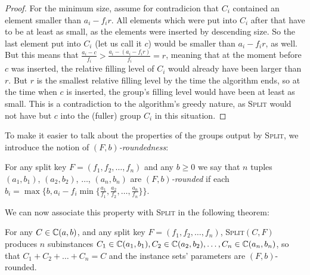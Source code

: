 \documentclass[%
    a4paper,              %
    style=screen,          %
    bibliography=totoc,   %
    nexus,                %
    lnum,                 %
    extramargin,          %
]{tubsbook}
\begin{document}
\begin{proof}
    For the minimum size, assume for contradicion that $C_i$ contained an element smaller than $a_i - f_i r$. All elements which were put into $C_i$ after that have to be at least as small, as the elements were inserted by descending size. So the last element put into $C_i$ (let us call it $c$) would be smaller than $a_i - f_i r$, as well.
    But this means that $\frac{a_i - c}{f_i} > \frac{a_i - (a_i - f_i r)}{f_i} = r$, meaning that at the moment before $c$ was inserted, the relative filling level of $C_i$ would already have been larger than $r$. But $r$ is the smallest relative filling level by the time the algorithm ends, so at the time when $c$ is inserted, the group's filling level would have been at least as small.
    This is a contradiction to the algorithm's greedy nature, as \textsc{Split} would not have but $c$ into the (fuller) group $C_i$ in this situation.
\end{proof}

To make it easier to talk about the properties of the groups output by \textsc{Split}, we introduce the notion of \emph{$(F,b)$-roundedness}:


\begin{definition}\label{def:rounded}
    For any split key $F = (f_1, f_2, \dots, f_n)$ and any $b \ge 0$ we say that $n$ tuples $(a_1, b_1)$, $(a_2, b_2)$, $\dots$, $(a_n, b_n)$ are \emph{$(F,b)$-rounded} if each $b_i = \max\{b,a_i - f_i \min\{\frac{a_1}{f_1}, \frac{a_2}{f_2}, \dots, \frac{a_n}{f_n}\}\}$.
\end{definition}

We can now associate this property with \textsc{Split} in the following theorem:

\begin{theorem}\label{th:split-sets}
    For any $C \in \mathbb{C}(a,b)$, and any split key $F = (f_1, f_2, \dots, f_n)$, \textsc{Split}$(C,F)$ produces $n$ subinstances $C_1 \in \mathbb{C}(a_1, b_1), C_2 \in \mathbb{C}(a_2, b_2), \dots, C_n \in \mathbb{C}(a_n, b_n)$, so that $C_1 + C_2 + \dots + C_n = C$ and the instance sets' parameters are $(F,b)$-rounded.
\end{theorem}
\end{document}
